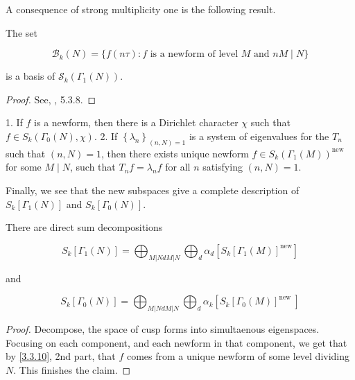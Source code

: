 A consequence of strong multiplicity one is the following result. 

\begin{theorem}\label{3.3.9}
    The set

$$
\mathcal{B}_{k}(N)=\{f(n \tau): f \text { is a newform of level } M \text { and } n M \mid N\}
$$

is a basis of $\mathcal{S}_{k}\left(\Gamma_{1}(N)\right)$.
\end{theorem}

\begin{proof}
    See, \cite{diamond2005first}, 5.3.8. 
\end{proof}


\begin{remark} \label{3.3.10}
1. If $f$ is a newform, then there is a Dirichlet character $\chi$ such that $f \in S_{k}\left(\Gamma_{0}(N), \chi\right)$.
2. If $\left\{\lambda_{n}\right\}_{(n, N)=1}$ is a system of eigenvalues for the $T_{n}$ such that $(n, N)=1$, then there exists unique newform $f \in S_{k}\left(\Gamma_{1}(M)\right)^{\text {new }}$ for some $M \mid N$, such that $T_{n} f=\lambda_{n} f$ for all $n$ satisfying $(n, N)=1$.
\end{remark}

Finally, we see that the new subspaces give a complete description of $S_{k}\left[\Gamma_{1}(N)\right]$ and $S_{k}\left[\Gamma_{0}(N)\right]$.

\begin{theorem}
    
There are direct sum decompositions

$$
S_{k}\left[\Gamma_{1}(N)\right]=\bigoplus_{M|N d M| N} \bigoplus_{d} \alpha_{d}\left[S_{k}\left[\Gamma_{1}(M)\right]^{\mathrm{new}}\right]
$$

and

$$
S_{k}\left[\Gamma_{0}(N)\right]=\bigoplus_{M|N d M| N} \bigoplus_{d} \alpha_{k}\left[S_{k}\left[\Gamma_{0}(M)\right]^{\text {new }}\right]
$$

\end{theorem}

\begin{proof}
Decompose, the space of cusp forms into simultaenous eigenspaces. Focusing on each component, and each newform in that component, we get that by \ref{3.3.10}, 2nd part, that $f$ comes from a unique newform of some level dividing $N$. This finishes the claim. 
\end{proof}
